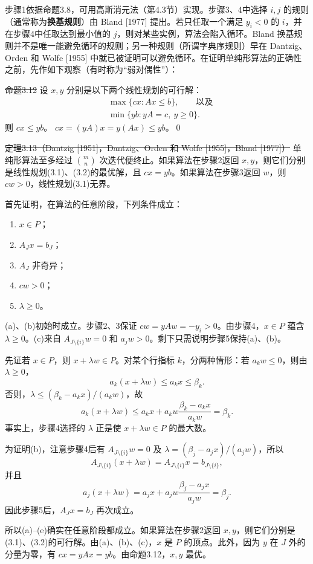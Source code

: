 步骤1依据命题3.8，可用高斯消元法（第4.3节）实现。步骤3、4中选择 $i,j$ 的规则（通常称为\textbf{换基规则}）由 Bland [1977] 提出。若只任取一个满足 $y_i<0$ 的 $i$，并在步骤4中任取达到最小值的 $j$，则对某些实例，算法会陷入循环。Bland 换基规则并不是唯一能避免循环的规则；另一种规则（所谓字典序规则）早在 Dantzig、Orden 和 Wolfe [1955] 中就已被证明可以避免循环。在证明单纯形算法的正确性之前，先作如下观察（有时称为“弱对偶性”）：

\st{命题3.12} 设 $x,y$ 分别是以下两个线性规划的可行解：
\begin{align}
&\max\{cx:Ax\le b\},\qquad\text{以及}\tag{3.1}\\
&\min\{yb:yA=c,\ y\ge0\}.\tag{3.2}
\end{align}
则 $cx\le yb$。
\pr $cx=(yA)x=y(Ax)\le yb$。\qed

\st{定理3.13（Dantzig [1951]，Dantzig、Orden 和 Wolfe [1955]，Bland [1977]）} 单纯形算法至多经过 $\binom mn$ 次迭代便终止。如果算法在步骤2返回 $x,y$，则它们分别是线性规划(3.1)、(3.2)的最优解，且 $cx=yb$。如果算法在步骤3返回 $w$，则 $cw>0$，线性规划(3.1)无界。

\pr 首先证明，在算法的任意阶段，下列条件成立：
\begin{enumerate}[label=(\alph*)]
\item $x\in P$；
\item $A_Jx=b_J$；
\item $A_J$ 非奇异；
\item $cw>0$；
\item $\lambda\ge0$。
\end{enumerate}
(a)、(b)初始时成立。步骤2、3保证 $cw=yAw=-y_i>0$。由步骤4，$x\in P$ 蕴含 $\lambda\ge0$。(c)来自 $A_{J\setminus\{i\}}w=0$ 和 $a_jw>0$。剩下只需说明步骤5保持(a)、(b)。

先证若 $x\in P$，则 $x+\lambda w\in P$。对某个行指标 $k$，分两种情形：若 $a_kw\le0$，则由 $\lambda\ge0$，
\[
a_k(x+\lambda w)\le a_kx\le\beta_k.
\]
否则，$\lambda\le(\beta_k-a_kx)/(a_kw)$，故
\[
a_k(x+\lambda w)\le a_kx+a_kw\frac{\beta_k-a_kx}{a_kw}=\beta_k.
\]
事实上，步骤4选择的 $\lambda$ 正是使 $x+\lambda w\in P$ 的最大数。

为证明(b)，注意步骤4后有 $A_{J\setminus\{i\}}w=0$ 及 $\lambda=(\beta_j-a_jx)/(a_jw)$，所以
\[
A_{J\setminus\{i\}}(x+\lambda w)=A_{J\setminus\{i\}}x=b_{J\setminus\{i\}},
\]
并且
\[
a_j(x+\lambda w)=a_jx+a_jw\frac{\beta_j-a_jx}{a_jw}=\beta_j.
\]
因此步骤5后，$A_Jx=b_J$ 再次成立。

所以(a)--(e)确实在任意阶段都成立。如果算法在步骤2返回 $x,y$，则它们分别是(3.1)、(3.2)的可行解。由(a)、(b)、(c)，$x$ 是 $P$ 的顶点。此外，因为 $y$ 在 $J$ 外的分量为零，有 $cx=yAx=yb$。由命题3.12，$x,y$ 最优。


